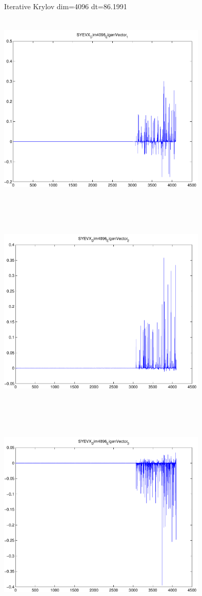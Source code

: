 \documentclass[9pt]{article}
\theoremstyle{plain}
\theoremstyle{definition}
\theoremstyle{remark}
\numberwithin{equation}{section}
\begin{document}
Iterative Krylov dim=4096 dt=86.1991
\includegraphics[width=10.0cm,height=10.0cm]{SYEVX_Dim4096_EigenVector_1.pdf}

\includegraphics[width=10.0cm,height=10.0cm]{SYEVX_Dim4096_EigenVector_2.pdf}

\includegraphics[width=10.0cm,height=10.0cm]{SYEVX_Dim4096_EigenVector_3.pdf}
\end{document}
